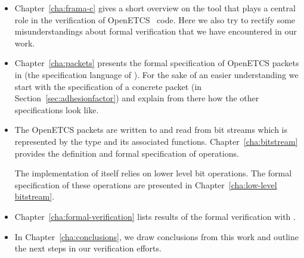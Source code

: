 \begin{itemize}
\item
Chapter~\ref{cha:frama-c} gives a short overview on the \framacwp tool
that plays a central role in the verification of OpenETCS \isoc~code.
Here we also try to rectify some misunderstandings about formal verification
that we have encountered in our work.

\item
Chapter~\ref{cha:packets} presents the formal specification of OpenETCS
packets in \acsl (the specification language of \framac).
For the sake of an easier understanding we start with the specification of
a concrete packet (\adhesion in Section~\ref{sec:adhesionfactor})
and explain from there how the other specifications look like.

\item
The OpenETCS packets are written to and read from bit streams which is represented
by the type  and its associated functions.
Chapter~\ref{cha:bitstream} provides the definition and formal specification
of  operations.

The implementation of  itself relies on lower level bit operations.
The formal specification of these operations are presented in Chapter~\ref{cha:low-level bitstream}.

\item 
Chapter~\ref{cha:formal-verification} lists results of the formal verification with \framacwp.

\item
In Chapter~\ref{cha:conclusions}, we draw conclusions from this work
and outline the next steps in our verification efforts.
\end{itemize}

